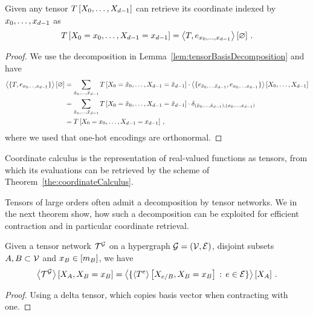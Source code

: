 \begin{theorem}\label{the:coordinateCalculus}
	Given any tensor $T\left[X_{0},\ldots,X_{d-1}\right]$ can retrieve its coordinate indexed by $x_{0},\ldots,x_{d-1}$ as
		\[ T\left[X_{0}=x_{0},\ldots,X_{d-1}=x_{d-1}\right] = \left\langle T, e_{x_{0},\ldots,x_{d-1}}\right\rangle \left[ \varnothing \right] \, . \]
\end{theorem}
\begin{proof}
	We use the decomposition in Lemma~\ref{lem:tensorBasisDecomposition} and have
	\begin{align*}
		\left\langle \{T, e_{x_{0},\ldots,x_{d-1}}\}\right\rangle \left[ \varnothing \right] 
		& = \sum_{\tilde{x}_{0},\ldots,\tilde{x}_{d-1}} T\left[X_{0}=\tilde{x}_0,\ldots,X_{d-1}=\tilde{x}_{d-1}\right] \cdot \left\langle \{e_{\tilde{x}_{0},\ldots,\tilde{x}_{d-1}} ,e_{x_{0},\ldots,x_{d-1}} \}\right\rangle \left[ X_{0},\ldots,X_{d-1} \right] \\
		& =  \sum_{\tilde{x}_{0},\ldots,\tilde{x}_{d-1}} T\left[X_{0}=\tilde{x}_0,\ldots,X_{d-1}=\tilde{x}_{d-1}\right] \cdot \delta_{(\tilde{x}_{0},\ldots,\tilde{x}_{d-1}),(x_{0},\ldots,x_{d-1})} \\
		& = T\left[X_{0}=x_{0},\ldots,X_{d-1}=x_{d-1}\right] \, ,
	\end{align*}
	where we used that one-hot encodings are orthonormal.
\end{proof}

Coordinate calculus is the representation of real-valued functions as tensors, from which its evaluations can be retrieved by the scheme of Theorem~\ref{the:coordinateCalculus}.




Tensors of large orders often admit a decomposition by tensor networks.
We in the next theorem show, how such a decomposition can be exploited for efficient contraction and in particular coordinate retrieval.


\begin{theorem}\label{the:slicedContractionToCores}
	Given a tensor network $\mathcal{T}^{\mathcal{G}}$ on a hypergraph $\mathcal{G}=(\mathcal{V},\mathcal{E})$, disjoint subsets $A,B\subset\mathcal{V}$ and $x_{B}\in[m_{B}]$, we have
		\[ \left\langle \mathcal{T}^{\mathcal{G}}\right\rangle \left[ X_{A},X_{B}=x_{B} \right] 
		=  \left\langle \{
			\left\langle T^{e}\right\rangle \left[ X_{e/B},X_{B}=x_{B} \right] \, : \, e\in\mathcal{E}
		\}\right\rangle \left[ X_{A} \right] \, .
		\]
\end{theorem}
\begin{proof}
	Using a delta tensor, which copies basis vector when contracting with one.
\end{proof}

